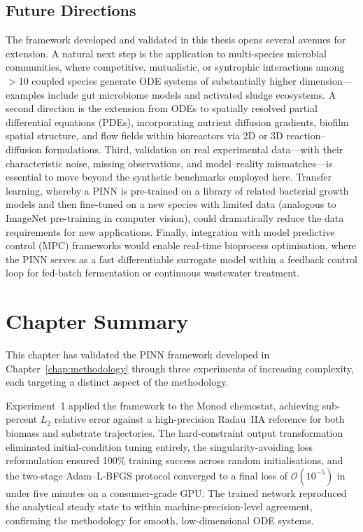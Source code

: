 \documentclass[14pt,a4paper,openany]{extbook}
\begin{document}
\subsection{Future Directions}
\label{subsec:future}

The framework developed and validated in this thesis opens several avenues for extension. A natural next step is the application to multi-species microbial communities, where competitive, mutualistic, or syntrophic interactions among $>$10 coupled species generate ODE systems of substantially higher dimension---examples include gut microbiome models and activated sludge ecosystems. A second direction is the extension from ODEs to spatially resolved partial differential equations (PDEs), incorporating nutrient diffusion gradients, biofilm spatial structure, and flow fields within bioreactors via 2D or 3D reaction--diffusion formulations. Third, validation on real experimental data---with their characteristic noise, missing observations, and model--reality mismatches---is essential to move beyond the synthetic benchmarks employed here. Transfer learning, whereby a PINN is pre-trained on a library of related bacterial growth models and then fine-tuned on a new species with limited data (analogous to ImageNet pre-training in computer vision), could dramatically reduce the data requirements for new applications. Finally, integration with model predictive control (MPC) frameworks would enable real-time bioprocess optimisation, where the PINN serves as a fast differentiable surrogate model within a feedback control loop for fed-batch fermentation or continuous wastewater treatment.

\section{Chapter Summary}
\label{sec:impl_summary}

This chapter has validated the PINN framework developed in Chapter~\ref{chap:methodology} through three experiments of increasing complexity, each targeting a distinct aspect of the methodology.

Experiment~1 applied the framework to the Monod chemostat, achieving sub-percent $L_2$ relative error against a high-precision Radau~IIA reference for both biomass and substrate trajectories. The hard-constraint output transformation eliminated initial-condition tuning entirely, the singularity-avoiding loss reformulation ensured 100\% training success across random initialisations, and the two-stage Adam--L-BFGS protocol converged to a final loss of $\mathcal{O}(10^{-5})$ in under five minutes on a consumer-grade GPU. The trained network reproduced the analytical steady state to within machine-precision-level agreement, confirming the methodology for smooth, low-dimensional ODE systems.
\end{document}

